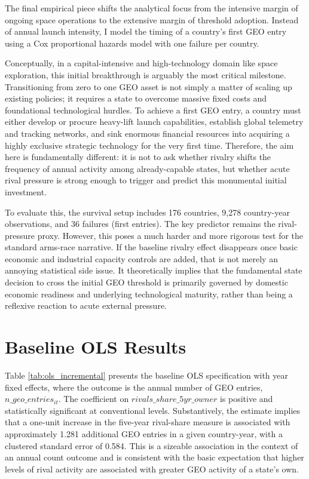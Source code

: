 \documentclass[11pt]{article}
\begin{document}
The final empirical piece shifts the analytical focus from the intensive margin of ongoing space operations to the extensive margin of threshold adoption. Instead of annual launch intensity, I model the timing of a country's first GEO entry using a Cox proportional hazards model with one failure per country. 

Conceptually, in a capital-intensive and high-technology domain like space exploration, this initial breakthrough is arguably the most critical milestone. Transitioning from zero to one GEO asset is not simply a matter of scaling up existing policies; it requires a state to overcome massive fixed costs and foundational technological hurdles. To achieve a first GEO entry, a country must either develop or procure heavy-lift launch capabilities, establish global telemetry and tracking networks, and sink enormous financial resources into acquiring a highly exclusive strategic technology for the very first time. Therefore, the aim here is fundamentally different: it is not to ask whether rivalry shifts the frequency of annual activity among already-capable states, but whether acute rival pressure is strong enough to trigger and predict this monumental initial investment.

To evaluate this, the survival setup includes 176 countries, 9,278 country-year observations, and 36 failures (first entries). The key predictor remains the rival-pressure proxy. However, this poses a much harder and more rigorous test for the standard arms-race narrative. If the baseline rivalry effect disappears once basic economic and industrial capacity controls are added, that is not merely an annoying statistical side issue. It theoretically implies that the fundamental state decision to cross the initial GEO threshold is primarily governed by domestic economic readiness and underlying technological maturity, rather than being a reflexive reaction to acute external pressure.

\section{Baseline OLS Results}

Table \ref{tab:ols_incremental} presents the baseline OLS specification with year fixed effects, where the outcome is the annual number of GEO entries, $n\_geo\_entries_{it}$. The coefficient on $rivals\_share\_5yr\_owner$ is positive and statistically significant at conventional levels. Substantively, the estimate implies that a one-unit increase in the five-year rival-share measure is associated with approximately 1.281 additional GEO entries in a given country-year, with a clustered standard error of 0.584. This is a sizeable association in the context of an annual count outcome and is consistent with the basic expectation that higher levels of rival activity are associated with greater GEO activity of a state's own.
\end{document}
